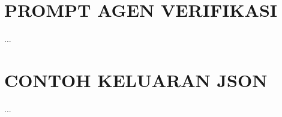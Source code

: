 \chapter{PROMPT AGEN VERIFIKASI}
\label{lamp:prompt}
...

\chapter{CONTOH KELUARAN JSON}
\label{lamp:json}
...
